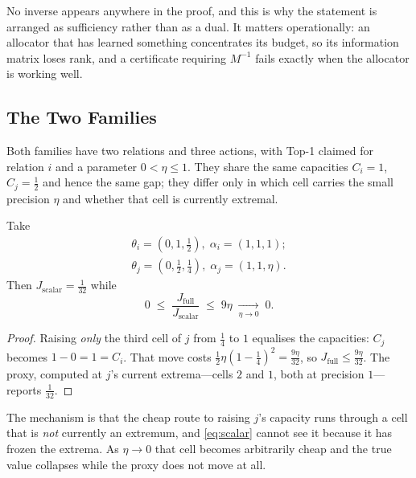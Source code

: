 
No inverse appears anywhere in the proof, and this is why the statement is arranged as
sufficiency rather than as a dual. It matters operationally: an allocator that has learned
something concentrates its budget, so its information matrix loses rank, and a certificate
requiring $M^{-1}$ fails exactly when the allocator is working well.

\subsection{The Two Families}
\label{sec:families}

Both families have two relations and three actions, with Top-1 claimed for relation $i$ and a
parameter $0<\eta\le1$. They share the same capacities $C_{i}=1$, $C_{j}=\tfrac12$ and hence
the same gap; they differ only in which cell carries the small precision $\eta$ and whether
that cell is currently extremal.

\begin{theorem}
\label{thm:family1}
Take
\begin{align}
\theta_{i}=(0,1,\tfrac12),\;\alpha_{i}=(1,1,1);\\
\theta_{j}=(0,\tfrac12,\tfrac14),\;\alpha_{j}=(1,1,\eta).
\end{align}
Then $J_{\mathrm{scalar}}=\tfrac{1}{32}$ while
\begin{equation}
0\;\leq\;\frac{J_{\mathrm{full}}}{J_{\mathrm{scalar}}}\;\leq\;9\eta
\;\xrightarrow[\eta\to0]{}\;0 .
\label{eq:family1}
\end{equation}
\end{theorem}

\begin{proof}
Raising \emph{only} the third cell of $j$ from $\tfrac14$ to $1$ equalises the capacities:
$C_{j}$ becomes $1-0=1=C_{i}$. That move costs
$\tfrac12\eta(1-\tfrac14)^{2}=\tfrac{9\eta}{32}$, so
$J_{\mathrm{full}}\le\tfrac{9\eta}{32}$. The proxy, computed at $j$'s current extrema---cells
$2$ and $1$, both at precision $1$---reports $\tfrac{1}{32}$.
\end{proof}


The mechanism is that the cheap route to raising $j$'s capacity runs through a cell that is
\emph{not} currently an extremum, and \eqref{eq:scalar} cannot see it because it has frozen
the extrema. As $\eta\to0$ that cell becomes arbitrarily cheap and the true value collapses
while the proxy does not move at all.

